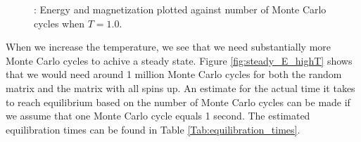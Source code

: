 \documentclass{article}
\begin{document}
{		\begin{figure}[H]
		\caption{: Energy and magnetization plotted against number of Monte Carlo cycles when $T = 1.0$.}
		\label{fig:steady_E}
		\end{figure}

		When we increase the temperature, we see that we need substantially more Monte Carlo cycles to achive a steady state. Figure \ref{fig:steady_E_highT} shows that we would need around 1 million Monte Carlo cycles for both the random matrix and the matrix with all spins up. An estimate for the actual time it takes to reach equilibrium based on the number of Monte Carlo cycles can be made if we assume that one Monte Carlo cycle equals 1 second. The estimated equilibration times can be found in Table \ref{Tab:equilibration_times}.

}
\end{document}
